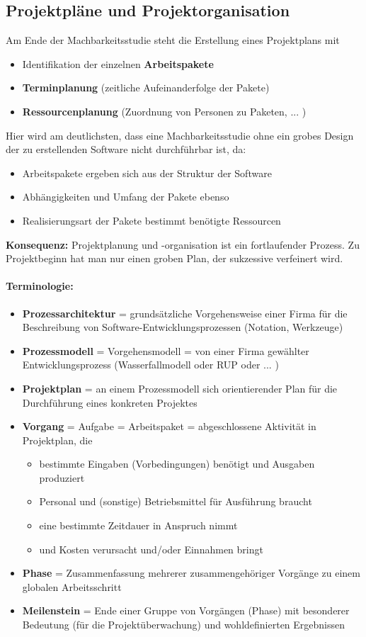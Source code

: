\subsection{Projektpläne und Projektorganisation}
Am Ende der Machbarkeitsstudie steht die Erstellung eines Projektplans mit
\begin{itemize}
	\item Identifikation der einzelnen \textbf{Arbeitspakete} 
	\item \textbf{Terminplanung} (zeitliche Aufeinanderfolge der Pakete)
	\item \textbf{Ressourcenplanung}  (Zuordnung von Personen zu Paketen, ... )
\end{itemize}
Hier wird am deutlichsten, dass eine Machbarkeitsstudie ohne ein grobes Design der zu erstellenden Software nicht durchführbar ist, da:
\begin{itemize}
	\item Arbeitspakete ergeben sich aus der Struktur der Software
	\item Abhängigkeiten und Umfang der Pakete ebenso
	\item Realisierungsart der Pakete bestimmt benötigte Ressourcen
\end{itemize}
\textbf{Konsequenz:} Projektplanung und -organisation ist ein fortlaufender Prozess. Zu Projektbeginn hat man nur einen groben Plan, der sukzessive verfeinert wird.

\paragraph{Terminologie:}
\begin{itemize}
	\item \textbf{Prozessarchitektur}  = grundsätzliche Vorgehensweise einer Firma für die Beschreibung von Software-Entwicklungsprozessen (Notation, Werkzeuge)
	\item \textbf{Prozessmodell} = Vorgehensmodell = von einer Firma gewählter Entwicklungsprozess (Wasserfallmodell oder RUP oder ... )
	\item \textbf{Projektplan} = an einem Prozessmodell sich orientierender Plan für die Durchführung eines konkreten Projektes
	\item \textbf{Vorgang} = Aufgabe = Arbeitspaket = abgeschlossene Aktivität in Projektplan, die
	\begin{itemize}
		\item bestimmte Eingaben (Vorbedingungen) benötigt und Ausgaben produziert
		\item Personal und (sonstige) Betriebsmittel für Ausführung braucht
		\item eine bestimmte Zeitdauer in Anspruch nimmt
		\item und Kosten verursacht und/oder Einnahmen bringt
	\end{itemize}
	\item \textbf{Phase} = Zusammenfassung mehrerer zusammengehöriger Vorgänge zu einem globalen Arbeitsschritt
	\item \textbf{Meilenstein} = Ende einer Gruppe von Vorgängen (Phase) mit besonderer Bedeutung (für die Projektüberwachung) und wohldefinierten Ergebnissen
\end{itemize}

